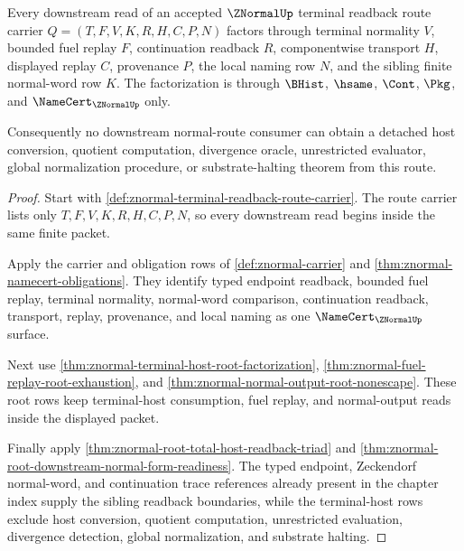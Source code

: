 \begin{theorem}
\label{thm:znormal-terminal-readback-route-exhaustion}
Every downstream read of an accepted $\ZNormalUp$ terminal readback route carrier $Q=(T,F,V,K,R,H,C,P,N)$ factors through terminal normality $V$, bounded fuel replay $F$, continuation readback $R$, componentwise transport $H$, displayed replay $C$, provenance $P$, the local naming row $N$, and the sibling finite normal-word row $K$. The factorization is through $\BHist$, $\hsame$, $\Cont$, $\Pkg$, and $\NameCert_{\ZNormalUp}$ only.

Consequently no downstream normal-route consumer can obtain a detached host conversion, quotient computation, divergence oracle, unrestricted evaluator, global normalization procedure, or substrate-halting theorem from this route.
\end{theorem}
\begin{proof}
Start with \autoref{def:znormal-terminal-readback-route-carrier}. The route carrier lists only $T,F,V,K,R,H,C,P,N$, so every downstream read begins inside the same finite packet.

Apply the carrier and obligation rows of \autoref{def:znormal-carrier} and \autoref{thm:znormal-namecert-obligations}. They identify typed endpoint readback, bounded fuel replay, terminal normality, normal-word comparison, continuation readback, transport, replay, provenance, and local naming as one $\NameCert_{\ZNormalUp}$ surface.

Next use \autoref{thm:znormal-terminal-host-root-factorization}, \autoref{thm:znormal-fuel-replay-root-exhaustion}, and \autoref{thm:znormal-normal-output-root-nonescape}. These root rows keep terminal-host consumption, fuel replay, and normal-output reads inside the displayed packet.

Finally apply \autoref{thm:znormal-root-total-host-readback-triad} and \autoref{thm:znormal-root-downstream-normal-form-readiness}. The typed endpoint, Zeckendorf normal-word, and continuation trace references already present in the chapter index supply the sibling readback boundaries, while the terminal-host rows exclude host conversion, quotient computation, unrestricted evaluation, divergence detection, global normalization, and substrate halting.
\end{proof}

